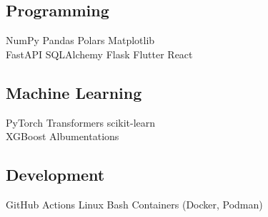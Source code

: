 \documentclass[]{resume-template}
\begin{document}
\begin{minipage}[t]{0.33\textwidth}
	\subsection{Programming}\label{subsec:programming}
	NumPy\textbullet{} Pandas\textbullet{} Polars\textbullet{} Matplotlib\\
	FastAPI \textbullet{} SQLAlchemy \textbullet{} Flask
	\newline{}
	Flutter \textbullet{} React


	\vspace*{1pt}\subsection{Machine Learning}\label{subsec:mltools}
	PyTorch \textbullet{} Transformers \textbullet{} scikit-learn \\
	XGBoost \textbullet{} Albumentations

	\vspace*{1pt}\subsection{Development}
	GitHub Actions\textbullet{}  Linux \textbullet{} Bash \textbullet{} Containers (Docker, Podman)



\end{minipage}
\end{document}
